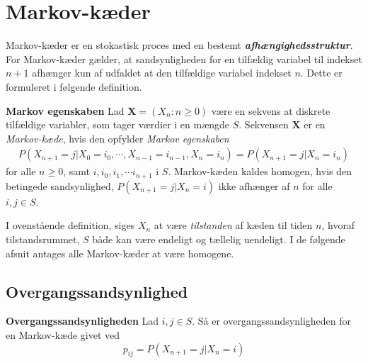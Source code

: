 \section{Markov-kæder}
Markov-kæder er en stokastisk proces med en bestemt \textbf{\textit{afhængighedsstruktur}}. For Markov-kæder gælder, at sandsynligheden for en tilfældig variabel til indekset $n+1$ afhænger kun af udfaldet at den tilfældige variabel indekset $n$. Dette er formuleret i følgende definition.

\begin{minipage}\textwidth
\begin{defn}\textbf{Markov egenskaben} %
\newline
Lad $\bm{X}=(X_n:n\geq 0)$ være en sekvens at diskrete tilfældige variabler, som tager værdier i en mængde $S$.
Sekvensen $\bm{X}$ er en \textit{Markov-kæde}, hvis den opfylder \textit{Markov egenskaben}
\begin{align*}
    P(X_{n+1} = j | X_0 = i_0, \cdots, X_{n-1} = i_{n-1}, X_n = i_n) =  P(X_{n+1} = j | X_n = i_n)
\end{align*}
for alle $n\geq 0$, samt $i, i_0, i_1, \cdots i_{n+1}$ i $S$.
Markov-kæden kaldes homogen, hvis den betingede sandsynlighed, $P(X_{n+1}=j|X_n=i)$ ikke afhænger af $n$ for alle $i,j\in S$.
\end{defn}
\end{minipage}

I ovenstående definition, siges $X_n$ at være \textit{tilstanden} af kæden til tiden $n$, hvoraf tilstandsrummet, $S$ både kan være endeligt og tællelig uendeligt. 
I de følgende afsnit antages alle Markov-kæder at være homogene.



\subsection{Overgangssandsynlighed}
\begin{minipage}\textwidth
\begin{defn}\textbf{Overgangssandsynligheden} %
\newline
Lad $i, j \in S$. Så er overgangssandsynligheden for en Markov-kæde givet ved $$p_{ij}=P(X_{n+1}=j|X_n=i)$$
\end{defn}
\end{minipage}


